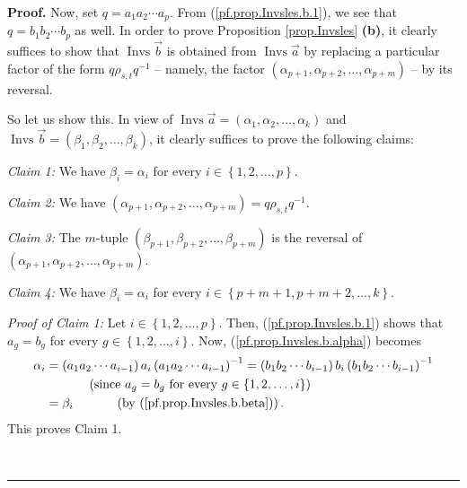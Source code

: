 \documentclass
[numbers=enddot,12pt,final,onecolumn,notitlepage,abstracton]{scrartcl}%
\theoremstyle{definition}
\newenvironment{proof}[1][Proof]{\noindent\textbf{#1.} }{\ \rule{0.5em}{0.5em}}
\begin{document}
\begin{proof}
Now, set $q=a_{1}a_{2}\cdots a_{p}$. From (\ref{pf.prop.Invsles.b.1}), we see
that $q=b_{1}b_{2}\cdots b_{p}$ as well. In order to prove Proposition
\ref{prop.Invsles} \textbf{(b)}, it clearly suffices to show that
$\operatorname*{Invs}\overrightarrow{b}$ is obtained from
$\operatorname*{Invs}\overrightarrow{a}$ by replacing a particular factor of
the form $q\rho_{s,t}q^{-1}$ -- namely, the factor $\left(  \alpha
_{p+1},\alpha_{p+2},\ldots,\alpha_{p+m}\right)  $ -- by its reversal.

So let us show this. In view of $\operatorname*{Invs}\overrightarrow{a}%
=\left(  \alpha_{1},\alpha_{2},\ldots,\alpha_{k}\right)  $ and
$\operatorname*{Invs}\overrightarrow{b}=\left(  \beta_{1},\beta_{2}%
,\ldots,\beta_{k}\right)  $, it clearly suffices to prove the following claims:

\textit{Claim 1:} We have $\beta_{i}=\alpha_{i}$ for every $i\in\left\{
1,2,\ldots,p\right\}  $.

\textit{Claim 2:} We have $\left(  \alpha_{p+1},\alpha_{p+2},\ldots
,\alpha_{p+m}\right)  =q\rho_{s,t}q^{-1}$.

\textit{Claim 3:} The $m$-tuple $\left(  \beta_{p+1},\beta_{p+2},\ldots
,\beta_{p+m}\right)  $ is the reversal of $\left(  \alpha_{p+1},\alpha
_{p+2},\ldots,\alpha_{p+m}\right)  $.

\textit{Claim 4:} We have $\beta_{i}=\alpha_{i}$ for every $i\in\left\{
p+m+1,p+m+2,\ldots,k\right\}  $.

\textit{Proof of Claim 1:} Let $i\in\left\{  1,2,\ldots,p\right\}  $. Then,
(\ref{pf.prop.Invsles.b.1}) shows that $a_{g}=b_{g}$ for every $g\in\left\{
1,2,\ldots,i\right\}  $. Now, (\ref{pf.prop.Invsles.b.alpha}) becomes%
\begin{align*}
\alpha_{i}  &  =\left(  a_{1}a_{2}\cdots a_{i-1}\right)  a_{i}\left(
a_{1}a_{2}\cdots a_{i-1}\right)  ^{-1}=\left(  b_{1}b_{2}\cdots b_{i-1}%
\right)  b_{i}\left(  b_{1}b_{2}\cdots b_{i-1}\right)  ^{-1}\\
&  \ \ \ \ \ \ \ \ \ \ \left(  \text{since }a_{g}=b_{g}\text{ for every }%
g\in\left\{  1,2,\ldots,i\right\}  \right) \\
&  =\beta_{i}\ \ \ \ \ \ \ \ \ \ \left(  \text{by
(\ref{pf.prop.Invsles.b.beta})}\right)  .
\end{align*}
This proves Claim 1.


\end{proof}
\end{document}
